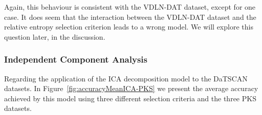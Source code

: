 Again, this behaviour is consistent with the VDLN-DAT dataset, except for one case. It does seem that the interaction between the VDLN-DAT dataset and the relative entropy selection criterion leads to a wrong model. We will explore this question later, in the discussion. 

\subsubsection{Independent Component Analysis}
Regarding the application of the \ac{ICA} decomposition model to the DaTSCAN datasets. In Figure~\ref{fig:accuracyMeanICA-PKS} we present the average accuracy achieved by this model using three different selection criteria and the three \ac{PKS} datasets. 

\begin{figure}
	
	

\end{figure}
